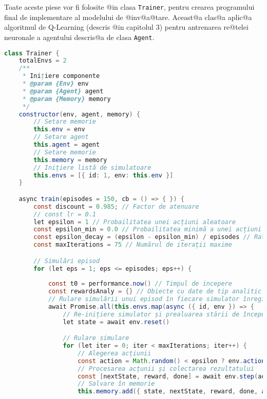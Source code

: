 Toate aceste piese vor fi folosite @in clasa \texttt{Trainer}, pentru crearea programului final de implementare al modelului de @inv@a@tare. Aceast@a clas@a aplic@a algoritmul de Q-Learning (descris @in capitolul 3) pentru antrenarea re@telei neuronale a agentului descris@a de clasa \texttt{Agent}.

\begin{lstlisting}[language=Java, caption={Structura clasei Trainer}]
class Trainer {
    totalEnvs = 2
    /**
     * Inițiere componente
     * @param {Env} env 
     * @param {Agent} agent 
     * @param {Memory} memory
     */
    constructor(env, agent, memory) {
        // Setare memorie
        this.env = env
        // Setare agent
        this.agent = agent
        // Setare memorie
        this.memory = memory
        // Inițiere listă de simulatoare
        this.envs = [{ id: 1, env: this.env }]
    }

    async train(episodes = 150, cb = () => { }) {
        const discount = 0.985; // Factor de atenuare
        // const lr = 0.1
        let epsilon = 1 // Probailitatea unei acțiuni aleatoare
        const epsilon_min = 0.0 // Probailitatea minimă a unei acțiuni aleatoare
        const epsilon_decay = (epsilon - epsilon_min) / episodes // Rata de scădere a probabilității
        const maxIterations = 75 // Numărul de iterații maxime

        // Simulări episod
        for (let eps = 1; eps <= episodes; eps++) {
        
            const t0 = performance.now() // Timpul de incepere
            const rewardsAnaly = {} // Obiecte cu date de tip analitic
            // Rulare simulării unui episod în fiecare simulator înregistrat în listă
            await Promise.all(this.envs.map(async ({ id, env }) => {
                // Re-inițiere simulator și prealuarea stării de început
                let state = await env.reset()

                // Rulare simulare
                for (let iter = 0; iter < maxIterations; iter++) {
                    // Alegerea acțiunii
                    const action = Math.random() < epsilon ? env.actionSample() : this.agent.getAction(state)
                    // Procesarea acțunii și colectarea rezultatului
                    const [nextState, reward, done] = await env.step(action)
                    // Salvare în memorie
                    this.memory.add({ state, nextState, reward, done, action })


\end{lstlisting}
